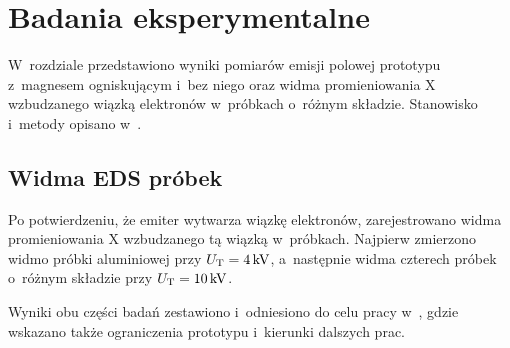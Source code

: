 \chapter{Badania eksperymentalne}
\label{ch:badania}

W~rozdziale przedstawiono wyniki pomiarów emisji polowej prototypu
z~magnesem ogniskującym i~bez niego oraz widma promieniowania X
wzbudzanego wiązką elektronów w~próbkach o~różnym składzie. Stanowisko
i~metody opisano w~.

\renewcommand{\figdir}{../emisja-magnes-pomiary/figures}
\renewcommand{\datadir}{../emisja-magnes-pomiary/dane}


\section{Widma EDS próbek}
\label{sec:widma}

Po potwierdzeniu, że emiter wytwarza wiązkę elektronów, zarejestrowano
widma promieniowania X wzbudzanego tą wiązką w~próbkach. Najpierw
zmierzono widmo próbki aluminiowej przy $U_\mathrm{T} = \SI{4}{\kilo\volt}$,
a~następnie widma czterech próbek o~różnym składzie przy
$U_\mathrm{T} = \SI{10}{\kilo\volt}$.



Wyniki obu części badań zestawiono i~odniesiono do celu pracy
w~, gdzie wskazano także ograniczenia
prototypu i~kierunki dalszych prac.
